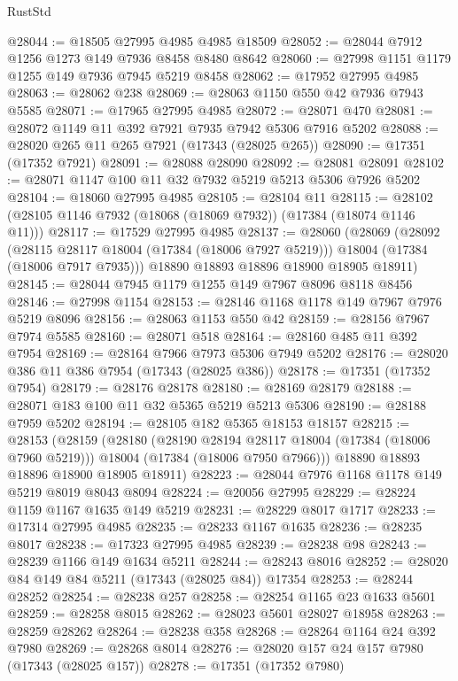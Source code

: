 \begin{lexlean}{RustStd}
\begin{coremodule}
@28044 := @18505 @27995 @4985 @4985 @18509
@28052 := @28044 @7912 @1256 @1273 @149 @7936 @8458 @8480 @8642
@28060 := @27998 @1151 @1179 @1255 @149 @7936 @7945 @5219 @8458
@28062 := @17952 @27995 @4985
@28063 := @28062 @238
@28069 := @28063 @1150 @550 @42 @7936 @7943 @5585
@28071 := @17965 @27995 @4985
@28072 := @28071 @470
@28081 := @28072 @1149 @11 @392 @7921 @7935 @7942 @5306 @7916 @5202
@28088 := @28020 @265 @11 @265 @7921 (@17343 (@28025 @265))
@28090 := @17351 (@17352 @7921)
@28091 := @28088 @28090
@28092 := @28081 @28091
@28102 := @28071 @1147 @100 @11 @32 @7932 @5219 @5213 @5306 @7926 @5202
@28104 := @18060 @27995 @4985
@28105 := @28104 @11
@28115 := @28102 (@28105 @1146 @7932 (@18068 (@18069 @7932)) (@17384 (@18074 @1146 @11)))
@28117 := @17529 @27995 @4985
@28137 := @28060
    (@28069
      (@28092
        (@28115 @28117 @18004 (@17384 (@18006 @7927 @5219)))
        @18004
        (@17384 (@18006 @7917 @7935)))
      @18890
      @18893
      @18896
      @18900
      @18905
      @18911)
@28145 := @28044 @7945 @1179 @1255 @149 @7967 @8096 @8118 @8456
@28146 := @27998 @1154
@28153 := @28146 @1168 @1178 @149 @7967 @7976 @5219 @8096
@28156 := @28063 @1153 @550 @42
@28159 := @28156 @7967 @7974 @5585
@28160 := @28071 @518
@28164 := @28160 @485 @11 @392 @7954
@28169 := @28164 @7966 @7973 @5306 @7949 @5202
@28176 := @28020 @386 @11 @386 @7954 (@17343 (@28025 @386))
@28178 := @17351 (@17352 @7954)
@28179 := @28176 @28178
@28180 := @28169 @28179
@28188 := @28071 @183 @100 @11 @32 @5365 @5219 @5213 @5306
@28190 := @28188 @7959 @5202
@28194 := @28105 @182 @5365 @18153 @18157
@28215 := @28153
    (@28159
      (@28180
        (@28190 @28194 @28117 @18004 (@17384 (@18006 @7960 @5219)))
        @18004
        (@17384 (@18006 @7950 @7966)))
      @18890
      @18893
      @18896
      @18900
      @18905
      @18911)
@28223 := @28044 @7976 @1168 @1178 @149 @5219 @8019 @8043 @8094
@28224 := @20056 @27995
@28229 := @28224 @1159 @1167 @1635 @149 @5219
@28231 := @28229 @8017 @1717
@28233 := @17314 @27995 @4985
@28235 := @28233 @1167 @1635
@28236 := @28235 @8017
@28238 := @17323 @27995 @4985
@28239 := @28238 @98
@28243 := @28239 @1166 @149 @1634 @5211
@28244 := @28243 @8016
@28252 := @28020 @84 @149 @84 @5211 (@17343 (@28025 @84)) @17354
@28253 := @28244 @28252
@28254 := @28238 @257
@28258 := @28254 @1165 @23 @1633 @5601
@28259 := @28258 @8015
@28262 := @28023 @5601 @28027 @18958
@28263 := @28259 @28262
@28264 := @28238 @358
@28268 := @28264 @1164 @24 @392 @7980
@28269 := @28268 @8014
@28276 := @28020 @157 @24 @157 @7980 (@17343 (@28025 @157))
@28278 := @17351 (@17352 @7980)

\end{coremodule}
\end{lexlean}

